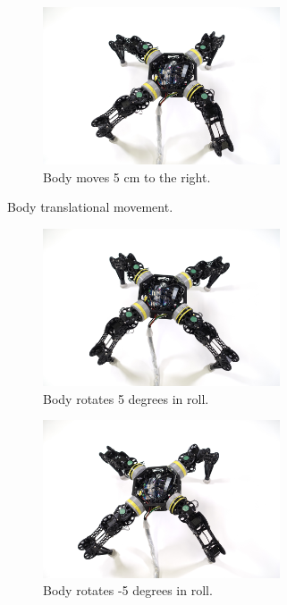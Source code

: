 \begin{figure}[ht]
\begin{subfigure}[b]{0.45\textwidth}
        \includegraphics[width=70mm]{./fig/chap4/body_movement/right05cmslant.JPG}
        \caption{Body moves 5 cm to the right.}
        \label{slantright}
    \end{subfigure}
    \caption{Body translational movement.}
    \label{slant}
\end{figure}

\begin{figure}[ht]
    \centering
    \begin{subfigure}[b]{0.45\textwidth}
        \centering
        \includegraphics[width=70mm]{./fig/chap4/body_movement/p05roll.JPG}
        \caption{Body rotates 5 degrees in roll.}
        \label{protroll}
    \end{subfigure}
    \begin{subfigure}[b]{0.45\textwidth}
        \centering
        \includegraphics[width=70mm]{./fig/chap4/body_movement/n05roll.JPG}
        \caption{Body rotates -5 degrees in roll.}
        \label{nrotroll}
    \end{subfigure}
    \\
    \begin{subfigure}[b]{0.45\textwidth}

\end{subfigure}
\end{figure}
